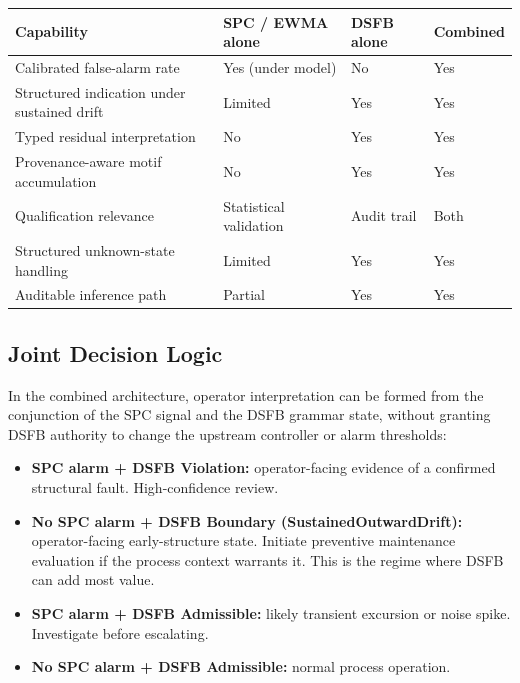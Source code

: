 \documentclass[11pt,letterpaper]{article}
\theoremstyle{scresult}
\begin{document}
\begin{center}
\footnotesize
\renewcommand{\arraystretch}{1.35}
\begin{tabular}{@{}p{3.8cm}p{3.0cm}p{3.0cm}p{2.4cm}@{}}
\toprule
\textbf{Capability} & \textbf{SPC / EWMA alone} & \textbf{DSFB alone} &
  \textbf{Combined} \\
\midrule
Calibrated false-alarm rate & Yes (under model) & No & Yes \\
Structured indication under sustained drift & Limited & Yes & Yes \\
Typed residual interpretation & No & Yes & Yes \\
Provenance-aware motif accumulation & No & Yes & Yes \\
Qualification relevance & Statistical validation & Audit trail & Both \\
Structured unknown-state handling & Limited & Yes & Yes \\
Auditable inference path & Partial & Yes & Yes \\
\bottomrule
\end{tabular}
\end{center}

\subsection{Joint Decision Logic}

In the combined architecture, operator interpretation can be formed from the
conjunction of the SPC signal and the DSFB grammar state, without granting
DSFB authority to change the upstream controller or alarm thresholds:

\begin{itemize}
  \item \textbf{SPC alarm + DSFB Violation:} operator-facing evidence of a
        confirmed structural fault. High-confidence review.
  \item \textbf{No SPC alarm + DSFB Boundary (SustainedOutwardDrift):}
        operator-facing early-structure state. Initiate preventive maintenance
        evaluation if the process context warrants it. This is the regime
        where DSFB can add most value.
  \item \textbf{SPC alarm + DSFB Admissible:} likely transient excursion
        or noise spike. Investigate before escalating.
  \item \textbf{No SPC alarm + DSFB Admissible:} normal process operation.
\end{itemize}
\end{document}
